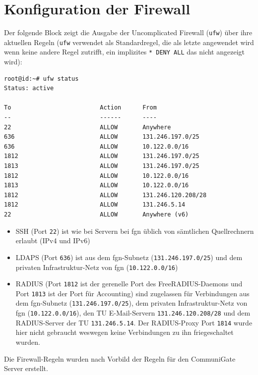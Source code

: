 \documentclass[11pt,a4paper,titlepage=firstiscover,headsepline,bibtotoc]{scrartcl} %
\begin{document}
\section{Konfiguration der Firewall}\label{sec:Firewall-Konfig}
Der folgende Block zeigt die Ausgabe der Uncomplicated Firewall (\texttt{ufw}) über ihre aktuellen Regeln (\texttt{ufw} verwendet als Standardregel, die als letzte angewendet wird wenn keine andere Regel zutrifft, ein implizites \texttt{* DENY ALL} das nicht angezeigt wird):
\begin{lstlisting}
root@id:~# ufw status
Status: active

To                         Action      From
--                         ------      ----
22                         ALLOW       Anywhere
636                        ALLOW       131.246.197.0/25
636                        ALLOW       10.122.0.0/16
1812                       ALLOW       131.246.197.0/25
1813                       ALLOW       131.246.197.0/25
1812                       ALLOW       10.122.0.0/16
1813                       ALLOW       10.122.0.0/16
1812                       ALLOW       131.246.120.208/28
1812                       ALLOW       131.246.5.14
22                         ALLOW       Anywhere (v6)
\end{lstlisting}
\begin{itemize}
\item SSH (Port \texttt{22}) ist wie bei Servern bei fgn üblich von sämtlichen Quellrechnern erlaubt (IPv4 und IPv6)
\item LDAPS (Port \texttt{636}) ist aus dem fgn-Subnetz (\texttt{131.246.197.0/25}) und dem privaten Infrastruktur-Netz von fgn (\texttt{10.122.0.0/16})
\item RADIUS (Port \texttt{1812} ist der gerenelle Port des FreeRADIUS-Daemons und Port \texttt{1813} ist der Port für Accounting) sind zugelassen für Verbindungen aus dem fgn-Subnetz (\texttt{131.246.197.0/25}), dem privaten Infrastruktur-Netz von fgn (\texttt{10.122.0.0/16}), den TU E-Mail-Servern \texttt{131.246.120.208/28} und dem RADIUS-Server der TU \texttt{131.246.5.14}. Der RADIUS-Proxy Port \texttt{1814} wurde hier nicht gebraucht weswegen keine Verbindungen zu ihn friegeschaltet wurden.
\end{itemize}
Die Firewall-Regeln wurden nach Vorbild der Regeln für den CommuniGate Server erstellt.

\newpage
\end{document}
